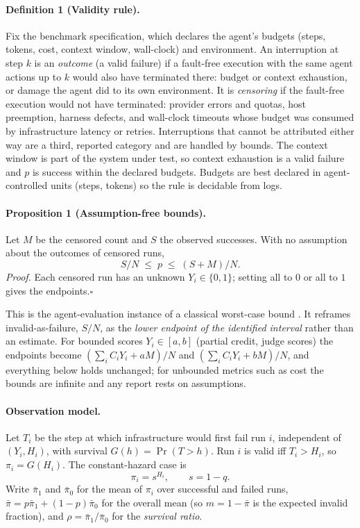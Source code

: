 \documentclass[letterpaper]{article} %
\newcommand{\pb}{\bar\pi}
\begin{document}
\paragraph{Definition 1 (Validity rule).} Fix the benchmark specification, which
declares the agent's budgets (steps, tokens, cost, context window, wall-clock)
and environment. An interruption at step $k$ is an \emph{outcome} (a valid
failure) if a fault-free execution with the same agent actions up to $k$ would
also have terminated there: budget or context exhaustion, or damage the agent
did to its own environment. It is \emph{censoring} if the fault-free execution
would not have terminated: provider errors and quotas, host preemption, harness
defects, and wall-clock timeouts whose budget was consumed by infrastructure
latency or retries. Interruptions that cannot be attributed either way are a
third, reported category and are handled by bounds. The context window is part
of the system under test, so context exhaustion is a valid failure and $p$ is
success within the declared budgets. Budgets are best declared in
agent-controlled units (steps, tokens) so the rule is decidable from logs.

\paragraph{Proposition 1 (Assumption-free bounds).}
Let $M$ be the censored count and $S$ the observed successes. With no
assumption about the outcomes of censored runs,
\begin{equation}
S/N \;\le\; p \;\le\; (S+M)/N .
\label{eq:bounds}
\end{equation}
\emph{Proof.} Each censored run has an unknown $Y_i\in\{0,1\}$; setting all to
$0$ or all to $1$ gives the endpoints.\hfill$\square$

This is the agent-evaluation instance of a classical worst-case bound
\citep{manski1990nonparametric}. It reframes invalid-as-failure, $S/N$, as the
\emph{lower endpoint of the identified interval} rather than an estimate. For
bounded scores $Y_i\in[a,b]$ (partial credit, judge scores) the endpoints become
$(\sum_i C_iY_i+aM)/N$ and $(\sum_i C_iY_i+bM)/N$, and everything below holds
unchanged; for unbounded metrics such as cost the bounds are infinite and any
report rests on assumptions.

\paragraph{Observation model.} Let $T_i$ be the step at which infrastructure
would first fail run $i$, independent of $(Y_i,H_i)$, with survival
$G(h)=\Pr(T>h)$. Run $i$ is valid iff $T_i>H_i$, so $\pi_i=G(H_i)$. The
constant-hazard case is
\begin{equation}
\pi_i = s^{H_i},\qquad s=1-q .
\label{eq:pi}
\end{equation}
Write $\pb_1$ and $\pb_0$ for the mean of $\pi_i$ over successful and failed
runs, $\pb=p\pb_1+(1-p)\pb_0$ for the overall mean (so $m=1-\pb$ is the
expected invalid fraction), and $\rho=\pb_1/\pb_0$ for the \emph{survival
ratio}.
\end{document}
